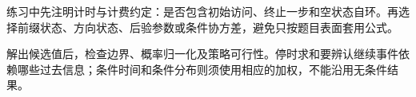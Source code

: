 练习中先注明计时与计费约定：是否包含初始访问、终止一步和空状态自环。再选择前缀状态、方向状态、后验参数或条件协方差，避免只按题目表面套用公式。

解出候选值后，检查边界、概率归一化及策略可行性。停时求和要辨认继续事件依赖哪些过去信息；条件时间和条件分布则须使用相应的加权，不能沿用无条件结果。
\par\smallskip
